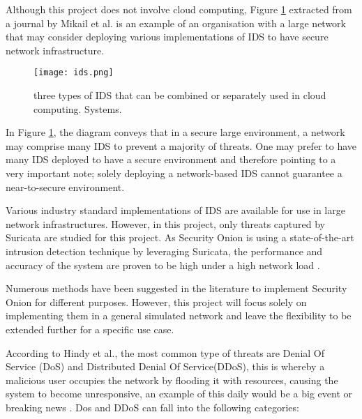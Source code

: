 \documentclass[12pt]{article}
\begin{document}
	Although this project does not involve cloud computing, Figure \ref{fig:Ids} extracted from a journal by Mikail et al. is an example of an organisation with a large network that may consider deploying various implementations of IDS to have secure network infrastructure.
	
	
	
	
	\begin{figure}[H]
		\centering
		\texttt{[image: ids.png]}
		\caption{ three types of IDS that can be combined or separately used in cloud computing. Systems.\cite{mikail_2019_securing}}
		\label{fig:Ids}
	\end{figure}
	
	
	
	
	In Figure \ref{fig:Ids}, the diagram conveys that in a secure large environment, a network may comprise many IDS to prevent a majority of threats. One may prefer to have many IDS deployed to have a secure environment and therefore pointing to a very important note; solely deploying a network-based IDS cannot guarantee a near-to-secure environment.
	
	Various industry standard implementations of IDS are available for use in large network infrastructures. However, in this project, only threats captured by Suricata are studied for this project. As Security Onion is using a state-of-the-art intrusion detection technique by leveraging Suricata, the performance and accuracy of the system are proven to be high under a high network load \cite{mikail_2019_securing}.
	
	
	Numerous methods have been suggested in the literature to implement Security Onion for different purposes. However, this project will focus solely on implementing them in a general simulated network and leave the flexibility to be extended further for a specific use case.
	
	
	According to Hindy et al., the most common type of threats are Denial Of Service (DoS) and Distributed  Denial Of Service(DDoS), this is whereby a malicious user occupies the network by flooding it with resources, causing the system to become unresponsive, an example of this daily would be a big event or breaking news \cite{hindy_2020_taxonomy}. Dos and DDoS can fall into the following categories:
	
\end{document}
